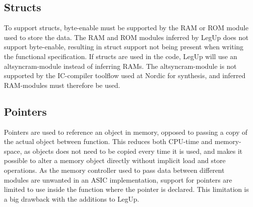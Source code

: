 \subsection{Structs}
To support structs, byte-enable must be supported by the RAM or ROM module used to store the data. The RAM and ROM modules inferred by LegUp does not support byte-enable, resulting in struct support not being present when writing the functional specification. If structs are used in the code, LegUp will use an altsyncram-module instead of inferring RAMs. The altsyncram-module is not supported by the IC-compiler toolflow used at Nordic for synthesis, and inferred RAM-modules must therefore be used. 
\subsection{Pointers}
Pointers are used to reference an object in memory, opposed to passing a copy of the actual object between function. This reduces both CPU-time and memory-space, as objects does not need to be copied every time it is used, and makes it possible to alter a memory object directly without implicit load and store operations. As the memory controller used to pass data between different modules are unwanted in an ASIC implementation, support for pointers are limited to use inside the function where the pointer is declared. This limitation is a big drawback with the additions to LegUp.
